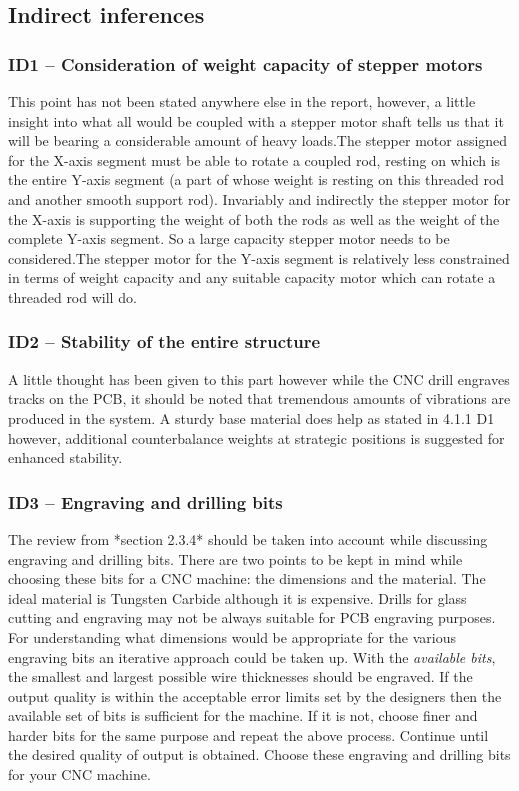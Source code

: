 \subsection{Indirect inferences}

\subsubsection*{ID1 – Consideration of weight capacity of stepper motors}

This point has not been stated anywhere else in the report, however, a little insight into what all would be coupled with a stepper motor shaft tells us that it will be bearing a considerable amount of heavy loads.The stepper motor assigned for the X-axis segment must be able to rotate a coupled rod, resting on which is the entire Y-axis segment (a part of whose weight is resting on this threaded rod and another smooth support rod). Invariably and indirectly the stepper motor for the X-axis is supporting the weight of both the rods as well as the weight of the complete Y-axis segment. So a large capacity stepper motor needs to be considered.The stepper motor for the Y-axis segment is relatively less constrained in terms of weight capacity and any suitable capacity motor which can rotate a threaded rod will do.

\subsubsection*{ID2 – Stability of the entire structure}

A little thought has been given to this part however while the CNC drill engraves tracks on the PCB, it should be noted that tremendous amounts of vibrations are produced in the system. A sturdy base material does help as stated in 4.1.1 D1 however, additional counterbalance weights at strategic positions is suggested for enhanced stability.

\subsubsection*{ID3 – Engraving and drilling bits}

The review from *section 2.3.4* should be taken into account while discussing engraving and drilling bits. There are two points to be kept in mind while choosing these bits for a CNC machine: the dimensions and the material. The ideal material is Tungsten Carbide although it is expensive. Drills for glass cutting and engraving may not be always suitable for PCB engraving purposes. For understanding what dimensions would be appropriate for the various engraving bits an iterative approach could be taken up. With the \textit{available bits}, the smallest and largest possible wire thicknesses should be engraved. If the output quality is within the acceptable error limits set by the designers then the available set of bits is sufficient for the machine. If it is not, choose finer and harder bits for the same purpose and repeat the above process. Continue until the desired quality of output is obtained. Choose these engraving and drilling bits for your CNC machine.

